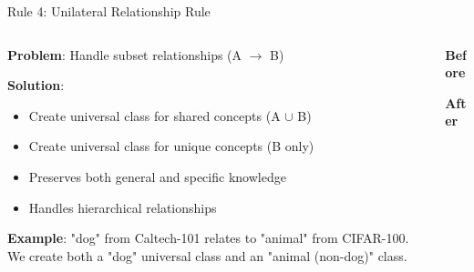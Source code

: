 \documentclass[aspectratio=169]{beamer}
\begin{document}
\begin{frame}{Rule 4: Unilateral Relationship Rule}
    \begin{columns}[T]
        \begin{column}{0.55\textwidth}
            \textbf{Problem}: Handle subset relationships (A $\rightarrow$ B)

            \vspace{0.5em}

            \textbf{Solution}:
            \begin{itemize}
                \item Create universal class for shared concepts (A $\cup$ B)
                \item Create universal class for unique concepts (B only)
                \item Preserves both general and specific knowledge
                \item Handles hierarchical relationships
            \end{itemize}

            \vspace{0.5em}

            \textbf{Example}: "dog" from Caltech-101 relates to "animal" from CIFAR-100. We create both a "dog" universal class and an "animal (non-dog)" class.
        \end{column}

        \begin{column}{0.4\textwidth}
            \begin{center}
                \textbf{Before} \\
                \vspace{0.5em}

                \vspace{1em}

                \textbf{After} \\
                \vspace{0.5em}
\end{center}
\end{column}
\end{columns}
\end{frame}
\end{document}
